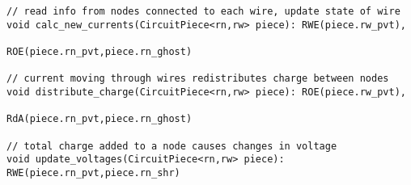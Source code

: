 \begin{lstlisting}[float={t},label={lst:code_ex},caption={Circuit Simulation Code Example}]
// read info from nodes connected to each wire, update state of wire
void calc_new_currents(CircuitPiece<rn,rw> piece): RWE(piece.rw_pvt),
                                                                         ROE(piece.rn_pvt,piece.rn_ghost)

// current moving through wires redistributes charge between nodes
void distribute_charge(CircuitPiece<rn,rw> piece): ROE(piece.rw_pvt),
                                                                         RdA(piece.rn_pvt,piece.rn_ghost)

// total charge added to a node causes changes in voltage
void update_voltages(CircuitPiece<rn,rw> piece): RWE(piece.rn_pvt,piece.rn_shr)
\end{lstlisting}
